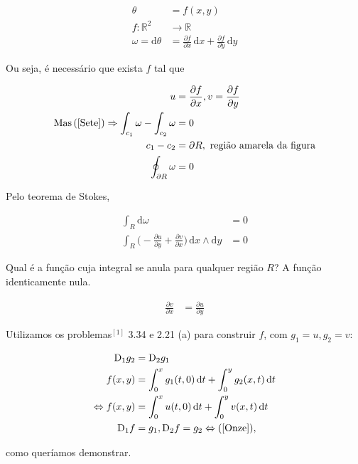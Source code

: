 \documentclass[12pt,a4paper]{article}
\begin{document}
		\begin{align}
			\theta &= f(x,y) \\
			f : \mathbb{R}^2 &\rightarrow \mathbb{R} \\
			\omega = \mathrm{d}\theta &= \frac{\partial f}{\partial x} \,\mathrm{d}x + \frac{\partial f}{\partial y} \,\mathrm{d}y
		\end{align}

		Ou seja, \'e necess\'ario que exista $f$ tal que

		\begin{align}
			u &= \frac{\partial f}{\partial x} , v = \frac{\partial f}{\partial y} \label{Onze}\\
			\mathrm{Mas}\, (\ref{Sete}) \Rightarrow \int_{c_1} \omega - \int_{c_2} \omega &= 0 \\
			c_1 - c_2 &= \partial R, \text{ regi\~ao amarela da figura} \\
			\oint_{\partial R} \omega &= 0
		\end{align}

		Pelo teorema de Stokes,

		\begin{align}
			\int_{R} \mathrm{d}\omega &= 0 \\
			\int_{R} \biggl( -\frac{\partial u}{\partial y} + \frac{\partial v}{\partial x} \biggl) \,\mathrm{d}x \wedge \mathrm{d}y &= 0
		\end{align}

		Qual \'e a fun\c{c}\~ao cuja integral se anula para qualquer regi\~ao $R$? A fun\c{c}\~ao identicamente nula.

		\begin{align}
			\frac{\partial v}{\partial x} &= \frac{\partial u}{\partial y}
		\end{align}

		Utilizamos os problemas$^{[1]}$ 3.34 e 2.21 (a) para construir $f$, com $g_1 = u, g_2 = v$:

		\begin{align}
			\mathrm{D}_1 g_2 &= \mathrm{D}_2 g_1 \\
			f(x,y) &= \int_0^x g_1(t,0) \,\mathrm{d}t + \int_0^y g_2(x,t) \,\mathrm{d}t \\
			\Leftrightarrow f(x,y) &= \int_0^x u(t,0) \,\mathrm{d}t + \int_0^y v(x,t) \,\mathrm{d}t \\
			\mathrm{D}_1 f &= g_1, \mathrm{D}_2 f = g_2 \Leftrightarrow (\ref{Onze}),
		\end{align}

		como quer\'iamos demonstrar.
\end{document}
